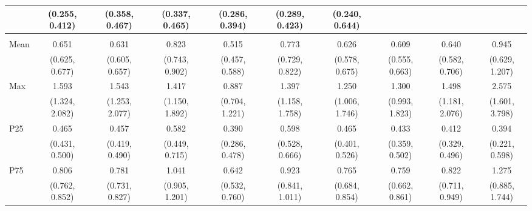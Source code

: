 {\begin{tabular}{l|c|c|c|c|c|c|c|c|c}
& {\scriptsize (0.255, 0.412)}
& {\scriptsize (0.358, 0.467)}
& {\scriptsize (0.337, 0.465)}
& {\scriptsize (0.286, 0.394)}
& {\scriptsize (0.289, 0.423)}
& {\scriptsize (0.240, 0.644)}
\\ [0.1cm]
\hline
\noalign{\smallskip}
\multicolumn{10}{l}{\textbf{Effect with Leads and Lags}} \\
\noalign{\smallskip}
\hline
Mean
& 0.651 & 0.631 & 0.823 & 0.515 & 0.773 & 0.626 & 0.609 & 0.640 & 0.945 \\
& {\scriptsize (0.625, 0.677)}
& {\scriptsize (0.605, 0.657)}
& {\scriptsize (0.743, 0.902)}
& {\scriptsize (0.457, 0.588)}
& {\scriptsize (0.729, 0.822)}
& {\scriptsize (0.578, 0.675)}
& {\scriptsize (0.555, 0.663)}
& {\scriptsize (0.582, 0.706)}
& {\scriptsize (0.629, 1.207)}
\\ [0.1cm]
\hline
Max
& 1.593 & 1.543 & 1.417 & 0.887 & 1.397 & 1.250 & 1.300 & 1.498 & 2.575 \\
& {\scriptsize (1.324, 2.082)}
& {\scriptsize (1.253, 2.077)}
& {\scriptsize (1.150, 1.892)}
& {\scriptsize (0.704, 1.221)}
& {\scriptsize (1.158, 1.758)}
& {\scriptsize (1.006, 1.746)}
& {\scriptsize (0.993, 1.823)}
& {\scriptsize (1.181, 2.076)}
& {\scriptsize (1.601, 3.798)}
\\ [0.1cm]
\hline
P25
& 0.465 & 0.457 & 0.582 & 0.390 & 0.598 & 0.465 & 0.433 & 0.412 & 0.394 \\
& {\scriptsize (0.431, 0.500)}
& {\scriptsize (0.419, 0.490)}
& {\scriptsize (0.449, 0.715)}
& {\scriptsize (0.286, 0.478)}
& {\scriptsize (0.528, 0.666)}
& {\scriptsize (0.401, 0.526)}
& {\scriptsize (0.359, 0.502)}
& {\scriptsize (0.329, 0.496)}
& {\scriptsize (0.221, 0.598)}
\\ [0.1cm]
\hline
P75
& 0.806 & 0.781 & 1.041 & 0.642 & 0.923 & 0.765 & 0.759 & 0.822 & 1.275 \\
& {\scriptsize (0.762, 0.852)}
& {\scriptsize (0.731, 0.827)}
& {\scriptsize (0.905, 1.201)}
& {\scriptsize (0.532, 0.760)}
& {\scriptsize (0.841, 1.011)}
& {\scriptsize (0.684, 0.854)}
& {\scriptsize (0.662, 0.861)}
& {\scriptsize (0.711, 0.949)}
& {\scriptsize (0.885, 1.744)}
\\ [0.1cm]
\hline
\hline
\end{tabular}
}
